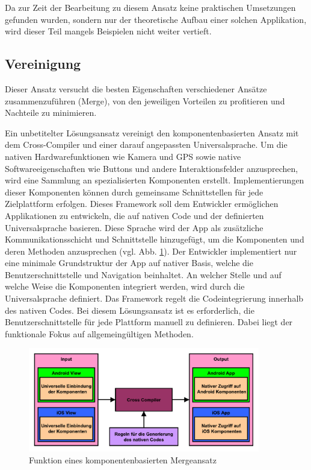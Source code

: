Da zur Zeit der Bearbeitung zu diesem Ansatz keine praktischen Umsetzungen gefunden wurden, sondern nur der theoretische Aufbau einer solchen Applikation, wird dieser Teil mangels Beispielen nicht weiter vertieft.

\subsection{Vereinigung}
Dieser Ansatz versucht die besten Eigenschaften verschiedener Ansätze zusammenzuführen (Merge), von den jeweiligen Vorteilen zu profitieren und Nachteile zu minimieren.

\bigskip
Ein unbetitelter Lösungsansatz vereinigt den komponentenbasierten Ansatz mit dem Cross-Compiler und einer darauf angepassten Universalsprache. Um die nativen Hardwarefunktionen wie Kamera und GPS sowie native Softwareeigenschaften wie Buttons und andere Interaktionsfelder anzusprechen, wird eine Sammlung an spezialisierten Komponenten erstellt. Implementierungen dieser Komponenten können durch gemeinsame Schnittstellen für jede Zielplattform erfolgen. Dieses Framework soll dem Entwickler ermöglichen Applikationen zu entwickeln, die auf nativen Code und der definierten Universalsprache basieren. Diese Sprache wird der App als zusätzliche Kommunikationsschicht und Schnittstelle hinzugefügt, um die Komponenten und deren Methoden anzusprechen (vgl. Abb. \ref{graph_merge_component_based}). Der Entwickler implementiert nur eine minimale Grundstruktur der App auf nativer Basis, welche die Benutzerschnittstelle und Navigation beinhaltet. An welcher Stelle und auf welche Weise die Komponenten integriert werden, wird durch die Universalsprache definiert. Das Framework regelt die Codeintegrierung innerhalb des nativen Codes. Bei diesem Lösungsansatz ist es erforderlich, die Benutzerschnittstelle für jede Plattform manuell zu definieren. Dabei liegt der funktionale Fokus auf allgemeingültigen Methoden.

\begin{figure}[htbp]
	\centering
	\includegraphics[width=0.9\textwidth]{Bilder/Merge_Component_based}
	\caption{Funktion eines komponentenbasierten Mergeansatz}\label{graph_merge_component_based}
\end{figure}

